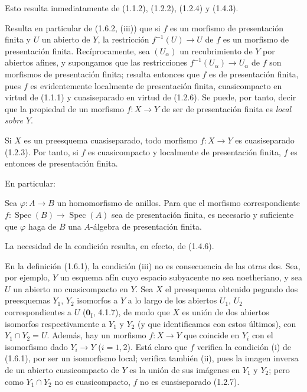 Esto resulta inmediatamente de (1.1.2), (1.2.2), (1.2.4) y (1.4.3).

Resulta en particular de (1.6.2, (iii)) que si $f$ es un morfismo de
presentación finita y $U$ un abierto de $Y$, la restricción
$f^{-1}(U)\to U$ de $f$ es un morfismo de presentación finita. Recíprocamente,
sea $(U_\alpha)$ un recubrimiento de $Y$ por abiertos afines, y supongamos
que las restricciones $f^{-1}(U_\alpha)\to U_\alpha$ de $f$ son
morfismos de presentación finita; resulta entonces que $f$ es de
presentación finita, pues $f$ es evidentemente localmente de presentación finita,
cuasicompacto en virtud de (1.1.1) y cuasiseparado en virtud de (1.2.6). Se puede,
por tanto, decir que la propiedad de un morfismo $f:X\to Y$ de ser de presentación
finita es \emph{local sobre $Y$}.

Si $X$ es un preesquema cuasiseparado, todo morfismo $f:X\to Y$ es
cuasiseparado (1.2.3). Por tanto, si $f$ es cuasicompacto y localmente de
presentación finita, $f$ es entonces de presentación finita.

En particular:

\begin{corollary}[1.6.3]
\label{IV.1.6.3-fr}
Sea $\varphi:A\to B$ un homomorfismo de anillos. Para que el morfismo
correspondiente $f:\operatorname{Spec}(B)\to\operatorname{Spec}(A)$ sea de presentación finita, es necesario y
suficiente que $\varphi$ haga de $B$ una $A$-álgebra de presentación finita.
\end{corollary}

La necesidad de la condición resulta, en efecto, de (1.4.6).

\begin{remark}[1.6.4]
\label{IV.1.6.4-fr}
En la definición (1.6.1), la condición (iii) no es consecuencia de las otras
dos. Sea, por ejemplo, $Y$ un esquema afín cuyo espacio subyacente no
sea noetheriano, y sea $U$ un abierto no cuasicompacto en $Y$. Sea
$X$ el preesquema obtenido pegando dos preesquemas $Y_1$, $Y_2$ isomorfos a
$Y$ a lo largo de los abiertos $U_1$, $U_2$ correspondientes a $U$ ($\mathbf{0}_{\mathrm I}$,
4.1.7), de modo que $X$ es unión de dos abiertos isomorfos respectivamente
a $Y_1$ y $Y_2$ (y que identificamos con estos últimos), con
$Y_1\cap Y_2=U$. Además, hay un morfismo $f:X\to Y$ que coincide en
$Y_i$ con el isomorfismo dado $Y_i\to Y$ ($i=1,2$). Está claro que $f$
verifica la condición (i) de (1.6.1), por ser un isomorfismo local; verifica
también (ii), pues la imagen inversa de un abierto cuasicompacto de $Y$ es la
unión de sus imágenes en $Y_1$ y $Y_2$; pero como $Y_1\cap Y_2$ no es
cuasicompacto, $f$ no es cuasiseparado (1.2.7).
\end{remark}

